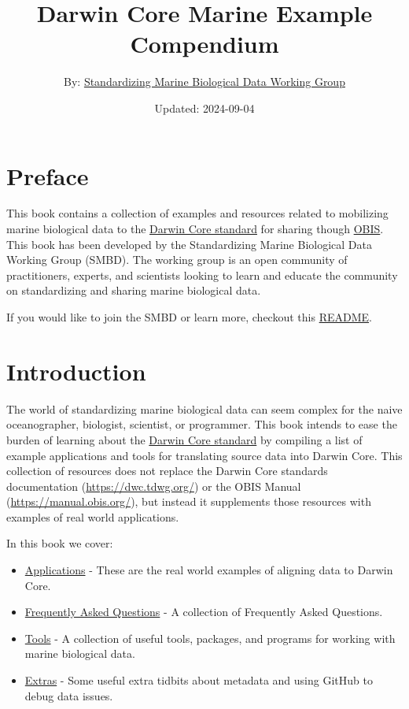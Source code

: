 \documentclass[
]{book}
\title{Darwin Core Marine Example Compendium}
\author{By: \href{https://github.com/ioos/bio_data_guide/graphs/contributors}{Standardizing Marine Biological Data Working Group}}
\date{Updated: 2024-09-04}
\providecommand{\tightlist}{%
  \setlength{\itemsep}{0pt}\setlength{\parskip}{0pt}}
\begin{document}
\maketitle

{
\setcounter{tocdepth}{1}
\tableofcontents
}
\hypertarget{preface}{%
\chapter*{Preface}\label{preface}}

This book contains a collection of examples and resources related to mobilizing marine biological data to the
\href{https://dwc.tdwg.org/}{Darwin Core standard} for sharing though \href{https://obis.org/}{OBIS}. This book has been developed
by the Standardizing Marine Biological Data Working Group (SMBD). The working group is an open community of practitioners,
experts, and scientists looking to learn and educate the community on standardizing and sharing marine biological data.

If you would like to join the SMBD or learn more, checkout this \href{https://github.com/ioos/bio_data_guide/blob/main/README.md}{README}.

\hypertarget{intro}{%
\chapter{Introduction}\label{intro}}

The world of standardizing marine biological data can seem complex for the naive oceanographer, biologist, scientist, or
programmer. This book intends to ease the burden of learning about the \href{https://dwc.tdwg.org/}{Darwin Core standard} by
compiling a list of example applications and tools for translating source data into Darwin Core. This collection of
resources does not replace the Darwin Core standards documentation (\url{https://dwc.tdwg.org/}) or the OBIS Manual (\url{https://manual.obis.org/}),
but instead it supplements those resources with examples of real world applications.

In this book we cover:

\begin{itemize}
\tightlist
\item
  \href{https://ioos.github.io/bio_data_guide/applications.html}{Applications} - These are the real world examples of aligning data to Darwin Core.
\item
  \href{https://ioos.github.io/bio_data_guide/frequently-asked-questions.html}{Frequently Asked Questions} - A collection of Frequently Asked Questions.
\item
  \href{https://ioos.github.io/bio_data_guide/tools.html}{Tools} - A collection of useful tools, packages, and programs for working with marine biological data.
\item
  \href{https://ioos.github.io/bio_data_guide/extras.html}{Extras} - Some useful extra tidbits about metadata and using GitHub to debug data issues.
\end{itemize}
\end{document}
